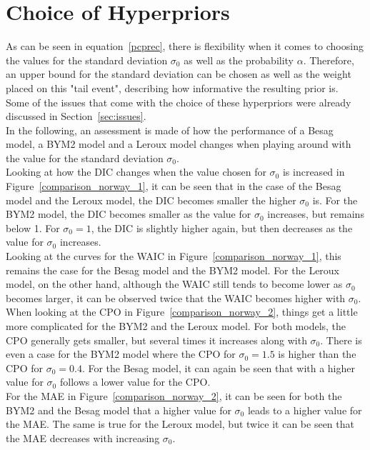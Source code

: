 \section{Choice of Hyperpriors}
As can be seen in equation~\ref{pcprec}, there is flexibility when it comes to choosing the values for the standard deviation $\sigma_0$ as well as the probability $\alpha$. Therefore, an upper bound for the standard deviation can be chosen as well as the weight placed on this "tail event", describing how informative the resulting prior is. \\
Some of the issues that come with the choice of these hyperpriors were already discussed in Section~\ref{sec:issues}. \\
In the following, an assessment is made of how the performance of a Besag model, a BYM2 model and a Leroux model changes when playing around with the value for the standard deviation $\sigma_0$. \\
Looking at how the DIC changes when the value chosen for $\sigma_0$ is increased in Figure~\ref{comparison_norway_1}, it can be seen that in the case of the Besag model and the Leroux model, the DIC becomes smaller the higher $\sigma_0$ is. For the BYM2 model, the DIC becomes smaller as the value for $\sigma_0$ increases, but remains below 1. For $\sigma_0 = 1$, the DIC is slightly higher again, but then decreases as the value for $\sigma_0$ increases. \\
Looking at the curves for the WAIC in Figure~\ref{comparison_norway_1}, this remains the case for the Besag model and the BYM2 model. For the Leroux model, on the other hand, although the WAIC still tends to become lower as $\sigma_0$ becomes larger, it can be observed twice that the WAIC becomes higher with $\sigma_0$. \\
When looking at the CPO in Figure~\ref{comparison_norway_2}, things get a little more complicated for the BYM2 and the Leroux model. For both models, the CPO generally gets smaller, but several times it increases along with $\sigma_0$. There is even a case for the BYM2 model where the CPO for $\sigma_0 = 1.5$ is higher than the CPO for $\sigma_0 = 0.4$. For the Besag model, it can again be seen that with a higher value for $\sigma_0$ follows a lower value for the CPO. \\
For the MAE in Figure~\ref{comparison_norway_2}, it can be seen for both the BYM2 and the Besag model that a higher value for $\sigma_0$ leads to a higher value for the MAE. The same is true for the Leroux model, but twice it can be seen that the MAE decreases with increasing $\sigma_0$. \\
